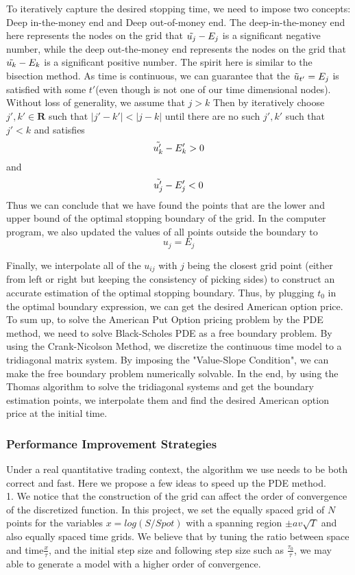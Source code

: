 \documentclass{article}
\begin{document}
To iteratively capture the desired stopping time, we need to impose two concepts: Deep in-the-money end and Deep out-of-money end. The deep-in-the-money end here represents the nodes on the grid that $\Tilde{u_j} - E_j$ is a significant negative number, while the deep out-the-money end represents the nodes on the grid that $\Tilde{u_k} - E_k$ is a significant positive number. The spirit here is similar to the bisection method. As time is continuous, we can guarantee that the $\Tilde{u}_{t'} = E_j$ is satisfied with some $t'$(even though is not one of our time dimensional nodes). Without loss of generality, we assume that $j>k$ Then by iteratively choose $j',k'\in \mathbf{R}$ such that $|j'-k'| < |j - k|$ until there are no such $j',k'$ such that $j'<k$ and satisfies $$\Tilde{u_k'} - E_k' > 0$$ and 
$$\Tilde{u_j'} - E_j' <0 $$ Thus we can conclude that we have found the points that are the lower and upper bound of the optimal stopping boundary of the grid. In the computer program, we also updated the values of all points outside the boundary to $$u_j = E_j$$

Finally, we interpolate all of the $u_{ij}$ with $j$ being the closest grid point (either from left or right but keeping the consistency of picking sides) to construct an accurate estimation of the optimal stopping boundary. Thus, by plugging $t_0$ in the optimal boundary expression, we can get the desired American option price. \\

To sum up, to solve the American Put Option pricing problem by the PDE method, we need to solve Black-Scholes PDE as a free boundary problem. By using the Crank-Nicolson Method, we discretize the continuous time model to a tridiagonal matrix system. By imposing the "Value-Slope Condition", we can make the free boundary problem numerically solvable. In the end, by using the Thomas algorithm to solve the tridiagonal systems and get the boundary estimation points, we interpolate them and find the desired American option price at the initial time. 
\subsubsection{Performance Improvement Strategies}
Under a real quantitative trading context, the algorithm we use needs to be both correct and fast. Here we propose a few ideas to speed up the PDE method.\\

1. We notice that the construction of the grid can affect the order of convergence of the discretized function. In this project, we set the equally spaced grid of $N$ points for the variables $x = log(S/Spot)$ with a spanning region $\pm av\sqrt{T}$ and also equally spaced time grids. We believe that by tuning the ratio between space and time$\frac{x}{\tau}$, and the initial step size and following step size such as $\frac{\tau_0}{\tau}$, we may able to generate a model with a higher order of convergence. \\
\end{document}
